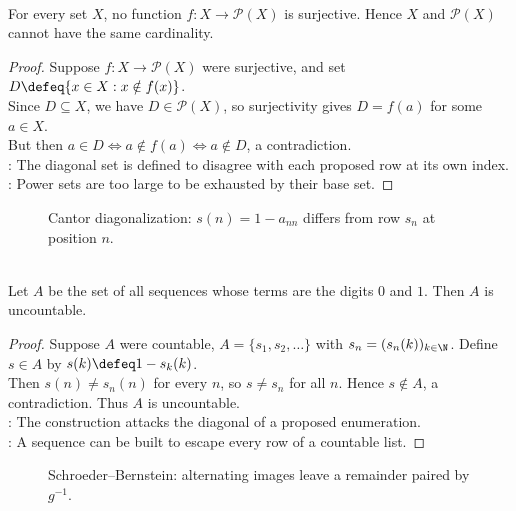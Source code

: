 \begin{theorem} \label{thm:cantor-power-set-theorem} \\
For every set $X$, no function $f:X\to\mathcal{P}(X)$ is surjective. Hence $X$ and $\mathcal{P}(X)$ cannot have the same cardinality.
\begin{proof}
Suppose $f:X\to\mathcal{P}(X)$ were surjective, and set $D\defeq\{x\in X:x\notin f(x)\}$.\\
Since $D\subseteq X$, we have $D\in\mathcal{P}(X)$, so surjectivity gives $D=f(a)$ for some $a\in X$.\\
But then $a\in D \Longleftrightarrow a\notin f(a) \Longleftrightarrow a\notin D$, a contradiction.\\
: The diagonal set is defined to disagree with each proposed row at its own index.\\
: Power sets are too large to be exhausted by their base set.
\end{proof}
\end{theorem}

\begin{figure}[H]
  \centering
  
  \caption{Cantor diagonalization: $s(n)=1-a_{nn}$ differs from row $s_n$ at position $n$.}
  \label{fig:cantor-diagonal-binary-sequences}
\end{figure}

\begin{theorem} \label{thm:binary-sequences-uncountable} \\
Let $A$ be the set of all sequences whose terms are the digits $0$ and $1$. Then $A$ is uncountable.
\begin{proof}
Suppose $A$ were countable, $A=\{s_1,s_2,\ldots\}$ with $s_n=(s_n(k))_{k\in\N}$. Define $s\in A$ by $s(k)\defeq 1-s_k(k)$.\\
Then $s(n)\neq s_n(n)$ for every $n$, so $s\neq s_n$ for all $n$. Hence $s\notin A$, a contradiction. Thus $A$ is uncountable.\\
: The construction attacks the diagonal of a proposed enumeration.\\
: A sequence can be built to escape every row of a countable list.
\end{proof}
\end{theorem}

\begin{figure}[H]
  \centering
  
  \caption{Schroeder--Bernstein: alternating images leave a remainder paired by $g^{-1}$.}
  \label{fig:schroeder-bernstein-ladder}
\end{figure}



